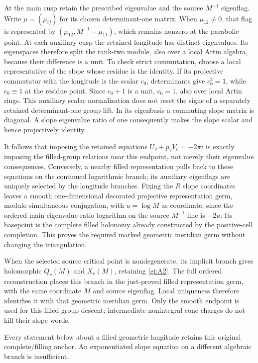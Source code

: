 At the main cusp retain the prescribed eigenvalue and the source
\(M^{-1}\) eigenflag. Write \(\mu=(\mu_{ij})\) for its chosen determinant-one matrix. When \(\mu_{12}\ne0\), that flag is
represented by \((\mu_{12},M^{-1}-\mu_{11})\), which remains nonzero at
the parabolic point. At each auxiliary cusp the retained longitude has
distinct eigenvalues. Its eigenspaces therefore split the rank-two
module, also over a local Artin algebra, because their difference is a
unit. To check strict commutation, choose a local representative of the
slope whose residue is the identity. If its projective commutator with
the longitude is the scalar \(c_0\), determinants give \(c_0^2=1\),
while \(c_0\equiv1\) at the residue point. Since \(c_0+1\) is a unit,
\(c_0=1\), also over local Artin rings. This auxiliary scalar
normalization does not reset the signs of a separately retained
determinant-one group lift. In its eigenbasis a commuting slope matrix
is diagonal. A slope eigenvalue ratio of one consequently makes the
slope scalar and hence projectively identity.

It follows that imposing the retained equations \(U_v+p_vV_v=-2\pi i\)
is exactly imposing the filled-group relations near this endpoint, not
merely their eigenvalue consequences. Conversely, a nearby filled
representation pulls back to these equations on the continued
logarithmic branch; its auxiliary eigenflags are uniquely selected by
the longitude branches. Fixing the \(R\) slope coordinates leaves a
smooth one-dimensional decorated projective representation germ, modulo simultaneous conjugation, with \(u=\log M\) as coordinate,
since the ordered main eigenvalue-ratio logarithm on the source
\(M^{-1}\) line is \(-2u\). Its basepoint is the complete filled
holonomy already constructed by the positive-cell completion. This
proves the required marked geometric meridian germ without changing the
triangulation.

When the selected source critical point is nondegenerate, its implicit
branch gives holomorphic \(Q_v(M)\) and \(X_e(M)\), retaining \eqref{gi:A2}. The
full ordered reconstruction places this branch in the just-proved filled
representation germ, with the same coordinate \(M\) and source
eigenflag. Local uniqueness therefore identifies it with that geometric
meridian germ. Only the smooth endpoint is used for this filled-group
descent; intermediate nonintegral cone charges do not kill their slope
words.

Every statement below about a filled geometric longitude retains this
original complete/filling anchor. An exponentiated slope equation on a
different algebraic branch is insufficient.

